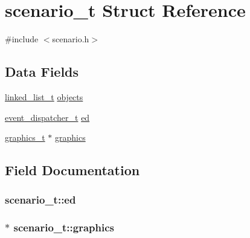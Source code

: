 \hypertarget{structscenario__t}{}\section{scenario\+\_\+t Struct Reference}
\label{structscenario__t}


{\ttfamily \#include $<$scenario.\+h$>$}

\subsection*{Data Fields}
\begin{DoxyCompactItemize}
\item 
\hyperlink{structlinked__list__t}{linked\+\_\+list\+\_\+t} \hyperlink{structscenario__t_ab01a8a6fa25d26374ff9b261e7512c1c}{objects}
\item 
\hyperlink{structevent__dispatcher__t}{event\+\_\+dispatcher\+\_\+t} \hyperlink{structscenario__t_a8687b4f6cafb5c9d4e1b324cc8d5c7c9}{ed}
\item 
\hyperlink{structgraphics__t}{graphics\+\_\+t} $\ast$ \hyperlink{structscenario__t_a00790b5954aa1761fec84cbd3319ed16}{graphics}
\end{DoxyCompactItemize}


\subsection{Field Documentation}
\subsubsection[{\texorpdfstring{ed}{ed}}]{ scenario\+\_\+t\+::ed}\hypertarget{structscenario__t_a8687b4f6cafb5c9d4e1b324cc8d5c7c9}{}\label{structscenario__t_a8687b4f6cafb5c9d4e1b324cc8d5c7c9}
\subsubsection[{\texorpdfstring{graphics}{graphics}}]{$\ast$ scenario\+\_\+t\+::graphics}\hypertarget{structscenario__t_a00790b5954aa1761fec84cbd3319ed16}{}\label{structscenario__t_a00790b5954aa1761fec84cbd3319ed16}
